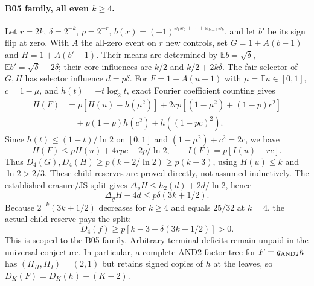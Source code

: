 \documentclass{article}
\begin{document}
\paragraph{B05 family, all even $k\ge4$.}
Let $r=2k$, $\delta=2^{-k}$, $p=2^{-r}$,
$b(x)=(-1)^{x_1x_2+\cdots+x_{k-1}x_k}$, and let $b'$ be its sign
flip at zero. With $A$ the all-zero event on $r$ new controls, set
$G=1+A(b-1)$ and $H=1+A(b'-1)$. Their means are determined by
$\mathbb Eb=\sqrt\delta$, $\mathbb Eb'=\sqrt\delta-2\delta$;
their core influences are $k/2$ and $k/2+2k\delta$.
The fair selector of $G,H$ has selector influence $d=p\delta$.
For $F=1+A(u-1)$ with $\mu=\mathbb Eu\in[0,1]$, $c=1-\mu$, and
$h(t)=-t\log_2t$, exact Fourier coefficient counting gives
\begin{align*}
H(F)&=p[H(u)-h(\mu^2)]
 +2rp[(1-\mu^2)+(1-p)c^2]\\
&\quad+p(1-p)h(c^2)+h((1-pc)^2).
\end{align*}
Since $h(t)\le(1-t)/\ln2$ on $[0,1]$ and
$(1-\mu^2)+c^2=2c$, we have
\[
H(F)\le pH(u)+4rpc+2p/\ln2,
\qquad I(F)=p[I(u)+rc].
\]
Thus $D_4(G),D_4(H)\ge p(k-2/\ln2)\ge p(k-3)$,
using $H(u)\le k$ and $\ln2>2/3$. These child reserves are proved
directly, not assumed inductively. The established erasure/JS split
gives $\Delta_yH\le h_2(d)+2d/\ln2$, hence
\[
\Delta_yH-4d\le p\delta(3k+1/2).
\]
Because $2^{-k}(3k+1/2)$ decreases for $k\ge4$ and equals $25/32$
at $k=4$, the actual child reserve pays the split:
\[
D_4(f)\ge p[k-3-\delta(3k+1/2)]>0.
\]
This is scoped to the B05 family. Arbitrary terminal deficits remain
unpaid in the universal conjecture. In particular, a complete AND2
factor tree for $F=g_{\rm AND2}h$ has $(\Pi_H,\Pi_I)=(2,1)$ but
retains signed copies of $h$ at the leaves, so
$D_K(F)=D_K(h)+(K-2)$.
\end{document}
